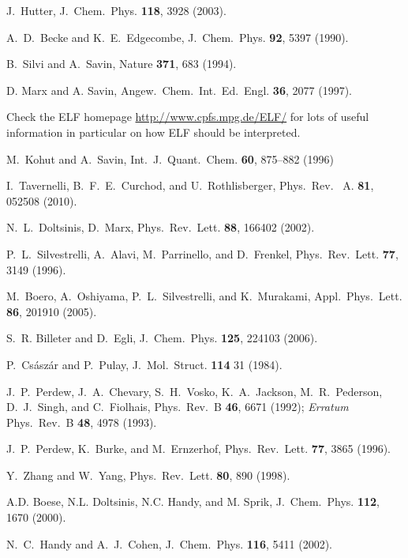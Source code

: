 \documentclass[twoside,10pt,titlepage,a4paper]{article}
\newcommand{\htref}[2]{\href{#1}{#2}}
\newcommand{\htref}[2]{\htmladdnormallink{#2}{#1}}
\begin{document}
\begin{thebibliography}{999}
 J.~Hutter,
    J.~Chem.~Phys. {\bf 118}, 3928 (2003).

    A.~D.~Becke and K.~E.~Edgecombe,
    J.~Chem.~Phys. {\bf 92}, 5397 (1990).

    B.~Silvi and A.~Savin,
    Nature {\bf 371}, 683 (1994).

    D. Marx and A. Savin,
    Angew.~Chem.~Int.~Ed.~Engl. {\bf 36}, 2077 (1997).

    Check the ELF homepage
    \htref{http://www.cpfs.mpg.de/ELF/}%
    {http://www.cpfs.mpg.de/ELF/}
    for lots of useful information in particular on how ELF
    should be interpreted.

    M.~Kohut and A.~Savin,
    Int.~J.~Quant.~Chem. {\bf 60}, 875--882 (1996)

    I.~Tavernelli, B.~F.~E.~Curchod, and U.~Rothlisberger,
    Phys.~Rev.~ A. {\bf 81}, 052508 (2010).

 N.~L.~Doltsinis, D.~Marx,
    Phys.~Rev.~Lett. {\bf 88}, 166402 (2002).

    P.~L.~Silvestrelli, A.~Alavi, M.~Parrinello, and D.~Frenkel,
    Phys.~Rev.~Lett. {\bf 77}, 3149 (1996).

    M.~Boero, A.~Oshiyama, P.~L.~Silvestrelli, and K.~Murakami,
    Appl.~Phys.~Lett. {\bf 86}, 201910 (2005).

    S.~R. Billeter and D.~Egli,
    J.~Chem.~Phys. {\bf 125}, 224103 (2006).

    P.~Cs\'asz\'ar and P.~Pulay,
    J.~Mol.~Struct. {\bf 114} 31 (1984).

    J.~P.~Perdew, J.~A.~Chevary, S.~H.~Vosko, K.~A.~Jackson,
    M.~R.~Pederson, D.~J.~Singh, and C.~Fiolhais, 
    Phys.~Rev.~B {\bf 46}, 6671 (1992);
    {\it Erratum} Phys.~Rev.~B {\bf 48}, 4978 (1993).

    J.~P.~Perdew, K.~Burke, and M.~Ernzerhof,  
    Phys.~Rev.~Lett. {\bf 77}, 3865 (1996).

    Y.~Zhang and W.~Yang, Phys.~Rev.~Lett. {\bf 80}, 890 (1998).

    A.D. Boese, N.L. Doltsinis, N.C. Handy, and M. Sprik,
    J.~Chem.~Phys. {\bf 112}, 1670 (2000).

    N.~C.~Handy and A.~J.~Cohen, 
    J.~Chem.~Phys. {\bf 116}, 5411 (2002).


\end{thebibliography}
\end{document}
